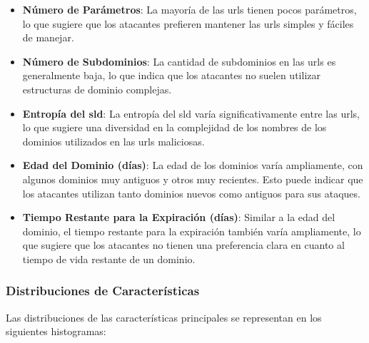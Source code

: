 \begin{itemize}
    \item \textbf{Número de Parámetros}: 
    La mayoría de las \glspl{url} tienen pocos parámetros, lo que sugiere que los atacantes prefieren mantener las \glspl{url} simples y fáciles de manejar.

    \item \textbf{Número de Subdominios}: 
    La cantidad de subdominios en las \glspl{url} es generalmente baja, lo que indica que los atacantes no suelen utilizar estructuras de dominio complejas.

    \item \textbf{Entropía del \gls{sld}}: 
    La entropía del \gls{sld} varía significativamente entre las \glspl{url}, lo que sugiere una diversidad en la complejidad de los nombres de los dominios utilizados en las \glspl{url} maliciosas.

    \item \textbf{Edad del Dominio (días)}: 
    La edad de los dominios varía ampliamente, con algunos dominios muy antiguos y otros muy recientes. Esto puede indicar que los atacantes utilizan tanto dominios nuevos como antiguos para sus ataques.

    \item \textbf{Tiempo Restante para la Expiración (días)}: 
    Similar a la edad del dominio, el tiempo restante para la expiración también varía ampliamente, lo que sugiere que los atacantes no tienen una preferencia clara en cuanto al tiempo de vida restante de un dominio.
\end{itemize}

\subsubsection*{Distribuciones de Características}

Las distribuciones de las características principales se representan en los siguientes histogramas:

